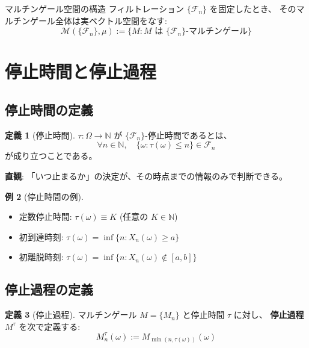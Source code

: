 \documentclass[a4paper,12pt]{ltjsarticle}
\theoremstyle{definition}
\newtheorem{definition}{定義}[section]
\newtheorem{example}[definition]{例}
\begin{document}
\begin{mainbox}{マルチンゲール空間の構造}
フィルトレーション $\{\mathcal{F}_n\}$ を固定したとき、
そのマルチンゲール全体は実ベクトル空間をなす:
\[
\mathcal{M}(\{\mathcal{F}_n\}, \mu) :=
\{ M : M \text{ は } \{\mathcal{F}_n\}\text{-マルチンゲール} \}
\]
\end{mainbox}

\section{停止時間と停止過程}

\subsection{停止時間の定義}

\begin{definition}[停止時間]
$\tau : \Omega \to \mathbb{N}$ が $\{\mathcal{F}_n\}$-停止時間であるとは、
\[
\forall n \in \mathbb{N}, \quad \{\omega : \tau(\omega) \leq n\} \in \mathcal{F}_n
\]
が成り立つことである。
\end{definition}

\textbf{直観}: 「いつ止まるか」の決定が、その時点までの情報のみで判断できる。

\begin{example}[停止時間の例]
\begin{itemize}
\item 定数停止時間: $\tau(\omega) \equiv K$ (任意の $K \in \mathbb{N}$)
\item 初到達時刻: $\tau(\omega) = \inf\{n : X_n(\omega) \geq a\}$
\item 初離脱時刻: $\tau(\omega) = \inf\{n : X_n(\omega) \notin [a,b]\}$
\end{itemize}
\end{example}

\subsection{停止過程の定義}

\begin{definition}[停止過程]
マルチンゲール $M = \{M_n\}$ と停止時間 $\tau$ に対し、
\textbf{停止過程} $M^\tau$ を次で定義する:
\[
M^\tau_n(\omega) := M_{\min(n, \tau(\omega))}(\omega)
\]
\end{definition}
\end{document}
